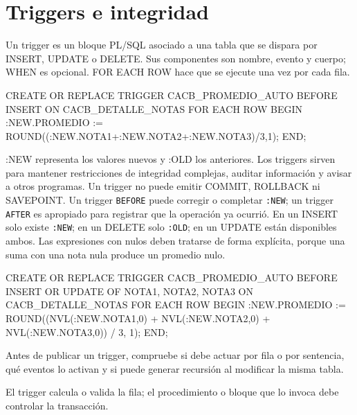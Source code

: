 \documentclass[10pt,letterpaper]{article}
\begin{document}
\section{Triggers e integridad}
Un trigger es un bloque PL/SQL asociado a una tabla que se dispara por INSERT,
UPDATE o DELETE. Sus componentes son nombre, evento y cuerpo; WHEN es opcional.
FOR EACH ROW hace que se ejecute una vez por cada fila.
\begin{sqlexample}
CREATE OR REPLACE TRIGGER CACB_PROMEDIO_AUTO
BEFORE INSERT ON CACB_DETALLE_NOTAS
FOR EACH ROW
BEGIN
  :NEW.PROMEDIO := ROUND((:NEW.NOTA1+:NEW.NOTA2+:NEW.NOTA3)/3,1);
END;
\end{sqlexample}
:NEW representa los valores nuevos y :OLD los anteriores. Los triggers sirven
para mantener restricciones de integridad complejas, auditar información y
avisar a otros programas. Un trigger no puede emitir COMMIT, ROLLBACK ni
SAVEPOINT.
Un trigger \texttt{BEFORE} puede corregir o completar \texttt{:NEW}; un trigger
\texttt{AFTER} es apropiado para registrar que la operación ya ocurrió. En un
INSERT solo existe \texttt{:NEW}; en un DELETE solo \texttt{:OLD}; en un UPDATE
están disponibles ambos. Las expresiones con nulos deben tratarse de forma
explícita, porque una suma con una nota nula produce un promedio nulo.
\begin{sqlexample}
CREATE OR REPLACE TRIGGER CACB_PROMEDIO_AUTO
BEFORE INSERT OR UPDATE OF NOTA1, NOTA2, NOTA3
ON CACB_DETALLE_NOTAS
FOR EACH ROW
BEGIN
  :NEW.PROMEDIO := ROUND((NVL(:NEW.NOTA1,0) +
                          NVL(:NEW.NOTA2,0) +
                          NVL(:NEW.NOTA3,0)) / 3, 1);
END;
\end{sqlexample}
Antes de publicar un trigger, compruebe si debe actuar por fila o por sentencia,
qué eventos lo activan y si puede generar recursión al modificar la misma tabla.
\begin{errorcritico}
El trigger calcula o valida la fila; el procedimiento o bloque que lo invoca
debe controlar la transacción.
\end{errorcritico}
\end{document}
